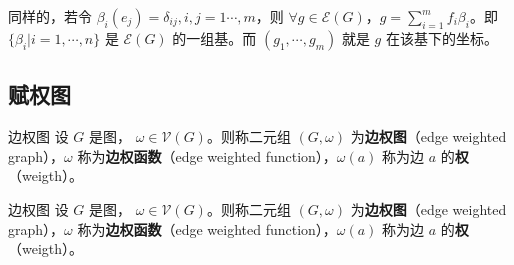 同样的，若令 $\beta_i(e_j)=\delta_{ij},i,j=1\cdots,m$，则 $\forall g\in\mathcal E(G)$，$g=\sum\limits_{i=1}^m f_i\beta_i$。即 $\{\beta_i|i=1,\cdots,n\}$ 是 $\mathcal E(G)$ 的一组基。而 $(g_1,\cdots,g_m)$ 就是 $g$ 在该基下的坐标。

\subsection{赋权图}

\begin{definition}{边权图}
设 $G$ 是图， $\omega\in\mathcal V(G)$。则称二元组 $(G,\omega)$ 为\textbf{边权图}（edge weighted graph），$\omega$ 称为\textbf{边权函数}（edge weighted function），$\omega(a)$ 称为边 $a$ 的\textbf{权}（weigth）。
\end{definition}

\begin{definition}{边权图}
设 $G$ 是图， $\omega\in\mathcal V(G)$。则称二元组 $(G,\omega)$ 为\textbf{边权图}（edge weighted graph），$\omega$ 称为\textbf{边权函数}（edge weighted function），$\omega(a)$ 称为边 $a$ 的\textbf{权}（weigth）。
\end{definition}









